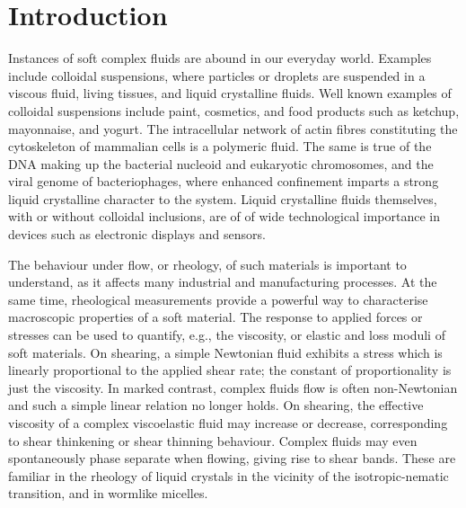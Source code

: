 \documentclass[8.5pt,twoside,twocolumn]{article}
\begin{document}


\section{Introduction}

Instances of soft complex fluids are abound in our everyday world. 
Examples include colloidal suspensions, 
where particles or droplets are suspended in a viscous
fluid, living tissues, and liquid crystalline fluids. Well known
examples of colloidal suspensions include paint, cosmetics, and
food products such as ketchup, mayonnaise, and yogurt.
The intracellular network of actin fibres constituting the
cytoskeleton of mammalian cells is a polymeric fluid.
The same is true of the DNA making up the bacterial nucleoid and
eukaryotic chromosomes, and the viral genome of bacteriophages,
where enhanced confinement imparts a strong liquid crystalline
character to the system.
Liquid crystalline fluids themselves, with or without colloidal
inclusions, are of of wide technological importance in devices
such as electronic displays and sensors.

The behaviour under flow, or rheology, of such materials is important
to understand, as it affects many industrial and manufacturing processes.
At the same time, rheological measurements provide a powerful way to
characterise macroscopic properties of a soft material.
The response to applied forces or stresses can be used to quantify,
e.g., the viscosity, or elastic and loss moduli of soft materials.
On shearing, a simple Newtonian fluid exhibits a stress which is
linearly proportional to the applied shear rate; the
constant of proportionality is just the viscosity. In marked
contrast, complex fluids flow is often non-Newtonian and such a simple
linear relation no longer holds. On shearing, the effective viscosity
of a complex viscoelastic fluid may increase or decrease, corresponding
to shear thinkening or shear thinning behaviour. Complex fluids may even
spontaneously phase separate when flowing, giving rise to shear bands.
These are familiar in the rheology of liquid crystals in the vicinity of
the isotropic-nematic transition, and in wormlike micelles.
\end{document}
